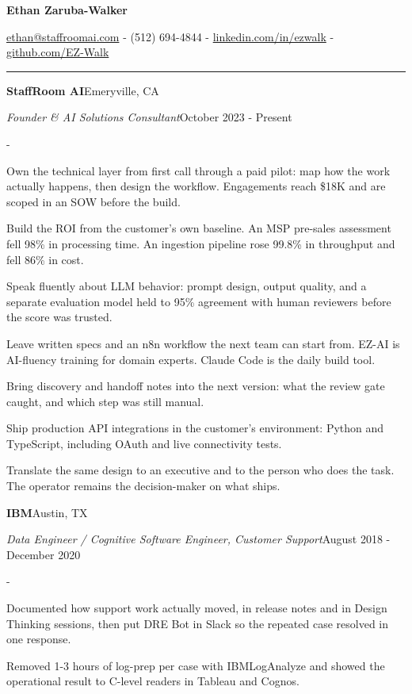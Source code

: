 \documentclass[10pt,letterpaper]{article}
\newenvironment{cvitems}{%
  \begin{list}{-}{%
    \setlength{\leftmargin}{12pt}%
    \setlength{\itemsep}{1.2pt}%
    \setlength{\parsep}{0pt}%
    \setlength{\topsep}{1.5pt}%
    \setlength{\partopsep}{0pt}%
    \setlength{\labelwidth}{6pt}%
    \setlength{\labelsep}{6pt}%
    \setlength{\itemindent}{0pt}%
  }%
}{\end{list}}
\newcommand{\cvsection}[1]{%
  \vspace{7pt}%
  \noindent{\bfseries\fontsize{11pt}{13pt}\selectfont\MakeUppercase{#1}}\par
  \vspace{1pt}%
  \noindent\rule{\textwidth}{0.4pt}\par
  \vspace{4pt}%
}
\newcommand{\cventryhead}[4]{%
  \noindent\textbf{#1}\hfill#2\par
  \vspace{0.5pt}%
  \noindent\textit{#3}\hfill#4\par
}
\begin{document}
\begin{center}
  {\bfseries\fontsize{22pt}{24pt}\selectfont Ethan Zaruba-Walker\par}
  \vspace{4pt}
  {\fontsize{10pt}{12pt}\selectfont
    \href{mailto:ethan@staffroomai.com}{ethan@staffroomai.com}
    {-}
    (512) 694-4844
    {-}
    \href{https://linkedin.com/in/ezwalk}{linkedin.com/in/ezwalk}
    {-}
    \href{https://github.com/EZ-Walk}{github.com/EZ-Walk}\par}
\end{center}
\vspace{2pt}

\cvsection{Experience}

\cventryhead{StaffRoom AI}{Emeryville, CA}
{Founder \& AI Solutions Consultant}{October 2023 - Present}
\begin{cvitems}
  \item Own the technical layer from first call through a paid pilot: map how the work actually happens, then design the workflow. Engagements reach \$18K and are scoped in an SOW before the build.
  \item Build the ROI from the customer's own baseline. An MSP pre-sales assessment fell 98\% in processing time. An ingestion pipeline rose 99.8\% in throughput and fell 86\% in cost.
  \item Speak fluently about LLM behavior: prompt design, output quality, and a separate evaluation model held to 95\% agreement with human reviewers before the score was trusted.
  \item Leave written specs and an n8n workflow the next team can start from. EZ-AI is AI-fluency training for domain experts. Claude Code is the daily build tool.
  \item Bring discovery and handoff notes into the next version: what the review gate caught, and which step was still manual.
  \item Ship production API integrations in the customer's environment: Python and TypeScript, including OAuth and live connectivity tests.
  \item Translate the same design to an executive and to the person who does the task. The operator remains the decision-maker on what ships.
\end{cvitems}

\vspace{3pt}
\cventryhead{IBM}{Austin, TX}
{Data Engineer / Cognitive Software Engineer, Customer Support}{August 2018 - December 2020}
\begin{cvitems}
  \item Documented how support work actually moved, in release notes and in Design Thinking sessions, then put DRE Bot in Slack so the repeated case resolved in one response.
  \item Removed 1-3 hours of log-prep per case with IBMLogAnalyze and showed the operational result to C-level readers in Tableau and Cognos.
\end{cvitems}
\end{document}
